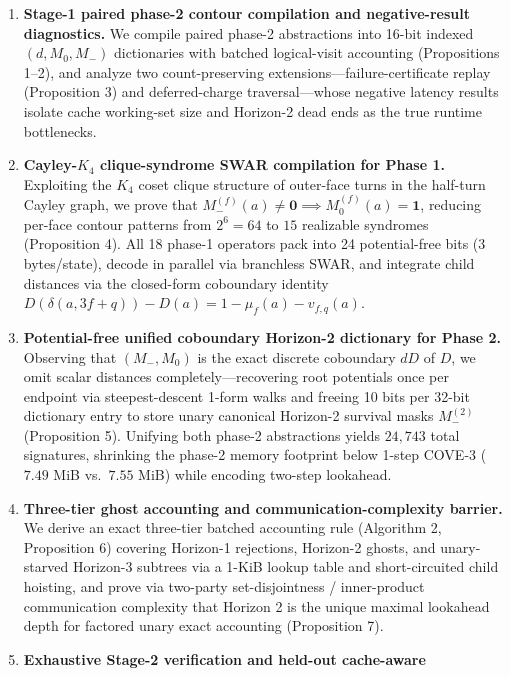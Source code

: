\documentclass[10pt,twocolumn,letterpaper]{article}
\providecommand{\tightlist}{\setlength{\itemsep}{0pt}\setlength{\parskip}{0pt}}
\begin{document}
\begin{enumerate}
\def\labelenumi{\arabic{enumi}.}
\tightlist
\item
  \textbf{Stage-1 paired phase-2 contour compilation and negative-result
  diagnostics.} We compile paired phase-2 abstractions into 16-bit
  indexed \((d, M_0, M_-)\) dictionaries with batched logical-visit
  accounting (Propositions 1--2), and analyze two count-preserving
  extensions---failure-certificate replay (Proposition 3) and
  deferred-charge traversal---whose negative latency results isolate
  cache working-set size and Horizon-2 dead ends as the true runtime
  bottlenecks.
\item
  \textbf{Cayley-\(K_4\) clique-syndrome SWAR compilation for Phase 1.}
  Exploiting the \(K_4\) coset clique structure of outer-face turns in
  the half-turn Cayley graph, we prove that
  \(M_-^{(f)}(a) \ne \mathbf{0} \implies M_0^{(f)}(a) = \mathbf{1}\),
  reducing per-face contour patterns from \(2^6 = 64\) to \(15\)
  realizable syndromes (Proposition 4). All 18 phase-1 operators pack
  into 24 potential-free bits (3 bytes/state), decode in parallel via
  branchless SWAR, and integrate child distances via the closed-form
  coboundary identity
  \(D(\delta(a, 3f+q)) - D(a) = 1 - \mu_f(a) - v_{f,q}(a)\).
\item
  \textbf{Potential-free unified coboundary Horizon-2 dictionary for
  Phase 2.} Observing that \((M_-, M_0)\) is the exact discrete
  coboundary \(dD\) of \(D\), we omit scalar distances
  completely---recovering root potentials once per endpoint via
  steepest-descent 1-form walks and freeing 10 bits per 32-bit
  dictionary entry to store unary canonical Horizon-2 survival masks
  \(M_-^{(2)}\) (Proposition 5). Unifying both phase-2 abstractions
  yields \(24,743\) total signatures, shrinking the phase-2 memory
  footprint below 1-step COVE-3 (\(7.49\) MiB vs.~\(7.55\) MiB) while
  encoding two-step lookahead.
\item
  \textbf{Three-tier ghost accounting and communication-complexity
  barrier.} We derive an exact three-tier batched accounting rule
  (Algorithm 2, Proposition 6) covering Horizon-1 rejections, Horizon-2
  ghosts, and unary-starved Horizon-3 subtrees via a 1-KiB lookup table
  and short-circuited child hoisting, and prove via two-party
  set-disjointness / inner-product communication complexity that Horizon
  2 is the unique maximal lookahead depth for factored unary exact
  accounting (Proposition 7).
\item
  \textbf{Exhaustive Stage-2 verification and held-out cache-aware
}
\end{enumerate}
\end{document}
